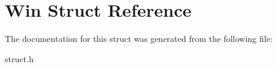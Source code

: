\hypertarget{struct_win}{}\section{Win Struct Reference}
\label{struct_win}


The documentation for this struct was generated from the following file\+:\begin{DoxyCompactItemize}
\item 
struct.\+h\end{DoxyCompactItemize}
